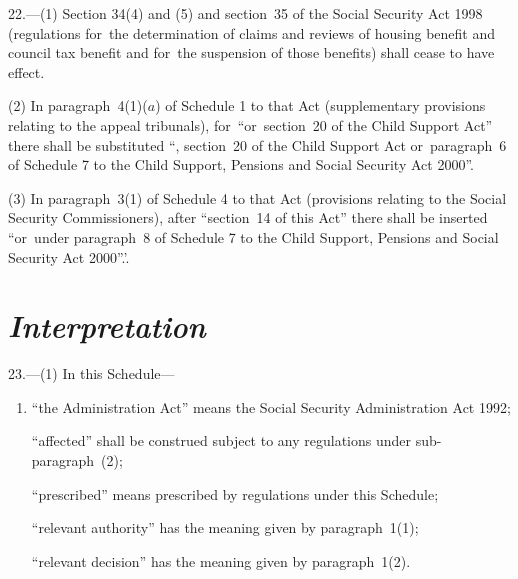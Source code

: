 \documentclass[12pt,a4paper]{article}
\begin{document}
22.---(1) Section 34(4)  and (5)  and section~35 of the Social Security Act 1998 (regulations for~the determination of claims and reviews of housing benefit and council tax benefit and for~the suspension of those benefits) shall cease to have effect.

(2) In paragraph~4(1)($a$)  of Schedule 1 to that Act (supplementary provisions relating to the appeal tribunals), for~“or~section~20 of the Child Support Act” there shall be substituted “, section~20 of the Child Support Act or~paragraph~6 of Schedule 7 to the Child Support, Pensions and Social Security Act 2000”.

(3) In paragraph~3(1)  of Schedule 4 to that Act (provisions relating to the Social Security Commissioners), after “section~14 of this Act” there shall be inserted “or~under paragraph~8 of Schedule 7 to the Child Support, Pensions and Social Security Act 2000”.'.


\section*{\itshape Interpretation}

23.---(1) In this Schedule—
\begin{enumerate}\item[]
    “the Administration Act” means the Social Security Administration Act 1992;

    “affected” shall be construed subject to any regulations under sub-\hspace{0pt}paragraph~(2);




    “prescribed” means prescribed by regulations under this Schedule;

    “relevant authority” has the meaning given by paragraph~1(1);

    “relevant decision” has the meaning given by paragraph~1(2). 
\end{enumerate}
\end{document}
